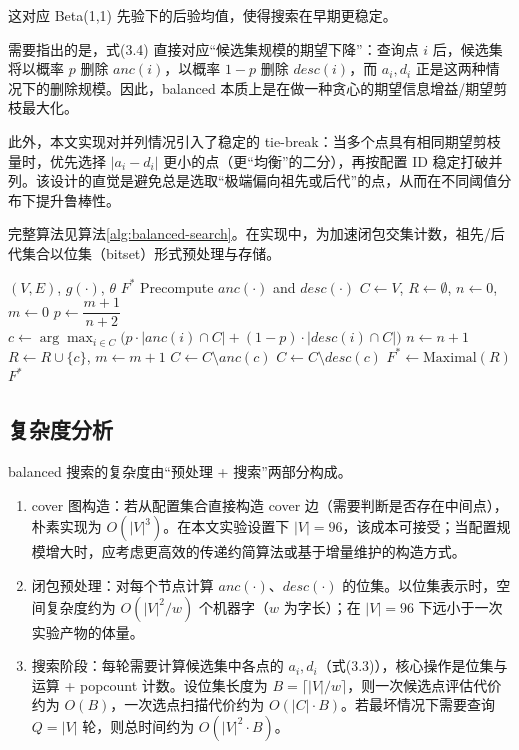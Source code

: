 \documentclass[UTF8,a4paper,12pt]{ctexart}
\numberwithin{equation}{section}
\begin{document}
这对应 Beta(1,1) 先验下的后验均值，使得搜索在早期更稳定。

需要指出的是，式(3.4) 直接对应``候选集规模的期望下降''：查询点 \(i\)
后，候选集将以概率 \(p\) 删除 \(anc(i)\)，以概率 \(1-p\) 删除
\(desc(i)\)，而 \(a_i,d_i\) 正是这两种情况下的删除规模。因此，balanced
本质上是在做一种贪心的期望信息增益/期望剪枝最大化。

此外，本文实现对并列情况引入了稳定的
tie-break：当多个点具有相同期望剪枝量时，优先选择 \(|a_i-d_i|\)
更小的点（更``均衡''的二分），再按配置 ID
稳定打破并列。该设计的直觉是避免总是选取``极端偏向祖先或后代''的点，从而在不同阈值分布下提升鲁棒性。

完整算法见算法\ref{alg:balanced-search}。在实现中，为加速闭包交集计数，祖先/后代集合以位集（bitset）形式预处理与存储。


\begin{algorithm}[htbp]
\caption{Balanced Search on Poset}
\label{alg:balanced-search}
\begin{algorithmic}[1]
\Require $(V,E)$, $g(\cdot)$, $\theta$
\Ensure $F^*$
\State Precompute $anc(\cdot)$ and $desc(\cdot)$
\State $C \gets V$, $R \gets \emptyset$, $n \gets 0$, $m \gets 0$
  \State $p \gets \dfrac{m+1}{n+2}$
  \State $c \gets \arg\max_{i\in C}\big(p\cdot |anc(i)\cap C| + (1-p)\cdot |desc(i)\cap C|\big)$
  \State $n \gets n+1$
    \State $R \gets R \cup \{c\}$, $m \gets m+1$
    \State $C \gets C \setminus anc(c)$
  \Else
    \State $C \gets C \setminus desc(c)$
  \EndIf
\EndWhile
\State $F^* \gets \text{Maximal}(R)$
\State \Return $F^*$
\end{algorithmic}
\end{algorithm}


\subsection{复杂度分析}

balanced 搜索的复杂度由``预处理 + 搜索''两部分构成。

\begin{enumerate}
\def\labelenumi{\arabic{enumi}.}
\item
  cover 图构造：若从配置集合直接构造 cover
  边（需要判断是否存在中间点），朴素实现为
  \(O(|V|^3)\)。在本文实验设置下
  \(|V|=96\)，该成本可接受；当配置规模增大时，应考虑更高效的传递约简算法或基于增量维护的构造方式。
\item
  闭包预处理：对每个节点计算 \(anc(\cdot)\)、\(desc(\cdot)\)
  的位集。以位集表示时，空间复杂度约为 \(O(|V|^2/w)\) 个机器字（\(w\)
  为字长）；在 \(|V|=96\) 下远小于一次实验产物的体量。
\item
  搜索阶段：每轮需要计算候选集中各点的
  \(a_i,d_i\)（式(3.3)），核心操作是位集与运算 + popcount
  计数。设位集长度为 \(B=\lceil |V|/w \rceil\)，则一次候选点评估代价约为
  \(O(B)\)，一次选点扫描代价约为 \(O(|C|\cdot B)\)。若最坏情况下需要查询
  \(Q=|V|\) 轮，则总时间约为 \(O(|V|^2\cdot B)\)。
\end{enumerate}
\end{document}

